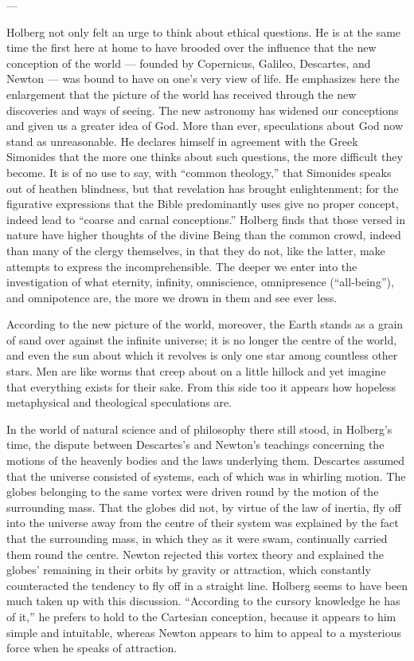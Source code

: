 \documentclass[12pt,a4paper]{book}
\newcommand{\opage}[1]{\marginnote{\footnotesize\textit{[#1]}}}
\begin{document}
\begin{center}---\end{center}

Holberg not only felt an urge to think about ethical questions. He is at the same
time the first here at home to have brooded over the influence that the new
conception of the world --- founded by Copernicus, Galileo, Descartes, and Newton
--- was bound to have on one's very view of life. He emphasizes here the
enlargement that the picture of the world has received through the new discoveries
and ways of seeing. The new astronomy has widened our conceptions and given us a
greater idea of God. More than ever, speculations about God now stand as
unreasonable. He declares himself in agreement with the Greek Simonides that the
more one thinks about such questions, the more difficult they become. It is of no
use to say, with ``common theology,'' that Simonides speaks out of heathen
blindness, but that revelation has brought enlightenment; for the figurative
expressions that the Bible predominantly uses give no proper concept, indeed lead
to ``coarse and carnal conceptions.'' Holberg finds that those versed in nature
have higher thoughts of the divine Being than the common crowd, indeed than many
of the clergy themselves, in that they do not, like the latter, make attempts to
express the incomprehensible. The deeper we enter into the investigation of what
eternity, infinity, omniscience, omnipresence (``all-being''), and omnipotence
are, the more we drown in them and see ever less.

\opage{13}According to the new picture of the world, moreover, the Earth stands as a grain
of sand over against the infinite universe; it is no longer the centre of the
world, and even the sun about which it revolves is only one star among countless
other stars. Men are like worms that creep about on a little hillock and yet
imagine that everything exists for their sake. From this side too it appears how
hopeless metaphysical and theological speculations are.

In the world of natural science and of philosophy there still stood, in Holberg's
time, the dispute between Descartes's and Newton's teachings concerning the
motions of the heavenly bodies and the laws underlying them. Descartes assumed
that the universe consisted of systems, each of which was in whirling motion. The
globes belonging to the same vortex were driven round by the motion of the
surrounding mass. That the globes did not, by virtue of the law of inertia, fly
off into the universe away from the centre of their system was explained by the
fact that the surrounding mass, in which they as it were swam, continually carried
them round the centre. Newton rejected this vortex theory and explained the
globes' remaining in their orbits by gravity or attraction, which constantly
counteracted the tendency to fly off in a straight line. Holberg seems to have
been much taken up with this discussion. ``According to the cursory knowledge he
has of it,'' he prefers to hold to the Cartesian conception, because it appears to
him simple and intuitable, whereas Newton appears to him to appeal to a mysterious
force when he speaks of attraction.
\end{document}

